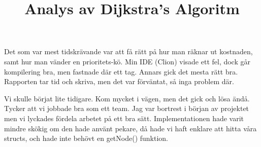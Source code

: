 \documentclass[fleqn,10pt]{article}
\begin{document}
\title{Analys av Dijkstra's Algoritm}

Det som var mest tidskrävande var att få rätt på hur man räknar ut kostnaden, samt hur man vänder en prioritets-kö. Min IDE (Clion) visade ett fel, dock går kompilering bra, men fastnade där ett tag. Annars gick det mesta rätt bra. Rapporten tar tid och skriva, men det var förväntat, så inga problem där.

Vi skulle börjat lite tidigare. Kom mycket i vägen, men det gick och lösa ändå. Tycker att vi jobbade bra som ett team. Jag var bortrest i början av projektet men vi lyckades fördela arbetet på ett bra sätt. Implementationen hade varit mindre skökig om den hade använt pekare, då hade vi haft enklare att hitta våra structs, och hade inte behövt en getNode() funktion. 
\end{document}
